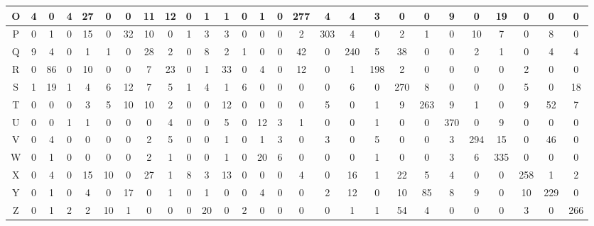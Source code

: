 \documentclass[11pt, oneside]{article}    %
\begin{document}
\begin{landscape}
\begin{tabular}{|c|c|c|c|c|c|c|c|c|c|c|c|c|c|c|c|c|c|c|c|c|c|c|c|c|c|c|}
  O & 4 & 0 & 4 & 27 & 0 & 0 & 11 & 12 & 0 & 1 & 1 & 0 & 1 & 0 & 277 & 4 & 4 & 3 & 0 & 0 & 9 & 0 & 19 & 0 & 0 & 0 \\ \hline
  P & 0 & 1 & 0 & 15 & 0 & 32 & 10 & 0 & 1 & 3 & 3 & 0 & 0 & 0 & 2 & 303 & 4 & 0 & 2 & 1 & 0 & 10 & 7 & 0 & 8 & 0 \\ \hline
  Q & 9 & 4 & 0 & 1 & 1 & 0 & 28 & 2 & 0 & 8 & 2 & 1 & 0 & 0 & 42 & 0 & 240 & 5 & 38 & 0 & 0 & 2 & 1 & 0 & 4 & 4 \\ \hline
  R & 0 & 86 & 0 & 10 & 0 & 0 & 7 & 23 & 0 & 1 & 33 & 0 & 4 & 0 & 12 & 0 & 1 & 198 & 2 & 0 & 0 & 0 & 0 & 2 & 0 & 0 \\ \hline
  S & 1 & 19 & 1 & 4 & 6 & 12 & 7 & 5 & 1 & 4 & 1 & 6 & 0 & 0 & 0 & 0 & 6 & 0 & 270 & 8 & 0 & 0 & 0 & 5 & 0 & 18 \\ \hline
  T & 0 & 0 & 0 & 3 & 5 & 10 & 10 & 2 & 0 & 0 & 12 & 0 & 0 & 0 & 0 & 5 & 0 & 1 & 9 & 263 & 9 & 1 & 0 & 9 & 52 & 7 \\ \hline
  U & 0 & 0 & 1 & 1 & 0 & 0 & 0 & 4 & 0 & 0 & 5 & 0 & 12 & 3 & 1 & 0 & 0 & 1 & 0 & 0 & 370 & 0 & 9 & 0 & 0 & 0 \\ \hline
  V & 0 & 4 & 0 & 0 & 0 & 0 & 2 & 5 & 0 & 0 & 1 & 0 & 1 & 3 & 0 & 3 & 0 & 5 & 0 & 0 & 3 & 294 & 15 & 0 & 46 & 0 \\ \hline
  W & 0 & 1 & 0 & 0 & 0 & 0 & 2 & 1 & 0 & 0 & 1 & 0 & 20 & 6 & 0 & 0 & 0 & 1 & 0 & 0 & 3 & 6 & 335 & 0 & 0 & 0 \\ \hline
  X & 0 & 4 & 0 & 15 & 10 & 0 & 27 & 1 & 8 & 3 & 13 & 0 & 0 & 0 & 4 & 0 & 16 & 1 & 22 & 5 & 4 & 0 & 0 & 258 & 1 & 2 \\ \hline
  Y & 0 & 1 & 0 & 4 & 0 & 17 & 0 & 1 & 0 & 1 & 0 & 0 & 4 & 0 & 0 & 2 & 12 & 0 & 10 & 85 & 8 & 9 & 0 & 10 & 229 & 0 \\ \hline
  Z & 0 & 1 & 2 & 2 & 10 & 1 & 0 & 0 & 0 & 20 & 0 & 2 & 0 & 0 & 0 & 0 & 1 & 1 & 54 & 4 & 0 & 0 & 0 & 3 & 0 & 266 \\ \hline
\end{tabular}
\end{landscape}
\endgroup
\end{document}
